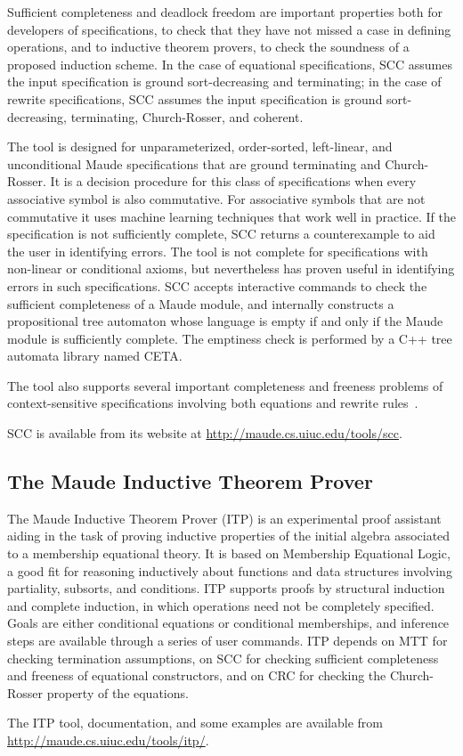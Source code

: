 Sufficient completeness and deadlock freedom are important properties both for developers 
of specifications, to check that they have not missed a case in defining
operations, and to inductive theorem provers, to check the soundness of
a proposed induction scheme. 
In the case of equational specifications, SCC assumes the 
input specification is ground sort-decreasing and terminating; 
in the case of rewrite specifications, SCC assumes the
input specification is ground sort-decreasing, terminating,
Church-Rosser, and coherent.

The tool is designed for unparameterized, order-sorted, left-linear, and 
unconditional Maude specifications that are ground terminating and Church-Rosser. 
It is a decision procedure for this class of specifications when every associative symbol 
is also commutative. For associative symbols that are not commutative it 
uses machine learning techniques that work well in practice. 
If the specification is not sufficiently complete, SCC returns a 
counterexample to aid the user in identifying errors. 
The tool is not complete for specifications with non-linear or 
conditional axioms, but nevertheless has proven useful in identifying 
errors in such specifications.
SCC accepts interactive commands to check the sufficient completeness of a Maude 
module, and internally constructs a propositional tree automaton whose language is 
empty if and only if the Maude module is sufficiently complete. The emptiness check is performed by 
a C++ tree automata library named CETA. 

The tool also supports several important completeness 
and freeness problems of context-sensitive specifications involving both equations
and rewrite rules~\cite{Rocha-Meseguer:2010,Hendrix:2008}.

SCC is available from its website at \url{http://maude.cs.uiuc.edu/tools/scc}.

\subsection{The Maude Inductive Theorem Prover}
\label{sec.itp}


The Maude Inductive Theorem Prover (ITP) is an experimental proof
assistant aiding in the task of proving inductive 
properties of the initial algebra 
associated to a membership equational theory. 
It is based on Membership Equational
Logic, a good fit for reasoning inductively about functions and
data structures involving partiality, subsorts, and conditions.
ITP supports proofs by structural induction and complete induction, 
in which operations need not be completely specified. Goals are either
conditional equations or conditional memberships, and inference steps are
available through a series of user commands.
ITP depends
on MTT for checking termination assumptions, on SCC
for checking sufficient completeness and freeness of equational
constructors, and on CRC for checking the Church-Rosser property
of the equations.

The ITP tool, documentation, and some examples are available from
\url{http://maude.cs.uiuc.edu/tools/itp/}.

